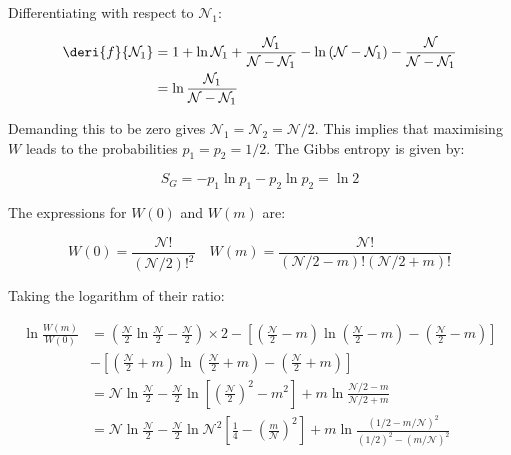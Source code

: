 \documentclass[12pt]{article}
\begin{document}
Differentiating with respect to $\mathcal{N}_{1}$:

\begin{equation}
    \begin{split}
        \deri{f}{\mathcal{N}_{1}} &= 1 + \ln{\mathcal{N}_{1}} + \frac{\mathcal{N}_{1}}{\mathcal{N} - \mathcal{N}_{1}} - \ln{(\mathcal{N} - \mathcal{N}_{1})} - \frac{\mathcal{N}}{\mathcal{N} - \mathcal{N}_{1}} \\
        &= \ln{\frac{\mathcal{N}_{1}}{\mathcal{N} - \mathcal{N}_{1}}}
    \end{split}
\end{equation}

Demanding this to be zero gives $\mathcal{N}_{1} = \mathcal{N}_{2} = \mathcal{N}/2$. This implies that maximising $W$ leads to the probabilities $p_{1} = p_{2} = 1/2$. The Gibbs entropy is given by:

\begin{equation}
    S_{G} = -p_{1} \ln{p_{1}} - p_{2} \ln{p_{2}} = \ln{2}
\end{equation}

The expressions for $W(0)$ and $W(m)$ are:

\begin{equation}
    W(0)  = \frac{\mathcal{N}!}{(\mathcal{N}/2)!^{2}} \quad W(m) = \frac{\mathcal{N}!}{(\mathcal{N}/2 - m)!(\mathcal{N}/2 + m)!}
\end{equation}

Taking the logarithm of their ratio:

\begin{equation}
    \begin{split}
        \ln{\frac{W(m)}{W(0)}} &= (\frac{\mathcal{N}}{2} \ln{\frac{\mathcal{N}}{2}} - \frac{\mathcal{N}}{2}) \times 2 - \left[ (\frac{\mathcal{N}}{2} - m) \ln{(\frac{\mathcal{N}}{2} - m)} - (\frac{\mathcal{N}}{2} - m) \right] \\
        &- \left[ (\frac{\mathcal{N}}{2} + m) \ln{(\frac{\mathcal{N}}{2} + m)} - (\frac{\mathcal{N}}{2} + m) \right] \\
        &= \mathcal{N} \ln{\frac{\mathcal{N}}{2}} - \frac{\mathcal{N}}{2} \ln{\left[ (\frac{\mathcal{N}}{2})^{2} - m^{2} \right]} + m \ln{\frac{\mathcal{N}/2 - m}{\mathcal{N}/2 + m}} \\
        &= \mathcal{N} \ln{\frac{\mathcal{N}}{2}} - \frac{\mathcal{N}}{2} \ln{\mathcal{N}^{2} \left[ \frac{1}{4} - (\frac{m}{\mathcal{N}})^{2} \right]} + m \ln{\frac{(1/2 - m/\mathcal{N})^{2}}{(1/2)^{2} - (m/\mathcal{N})^{2}}}
    \end{split}
\end{equation}
\end{document}
